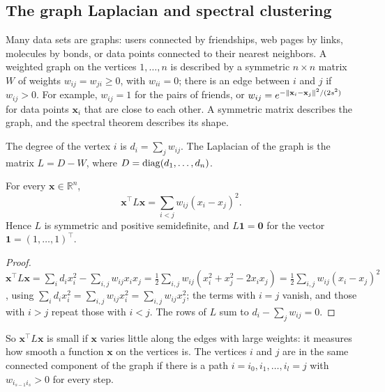 \subsection{The graph Laplacian and spectral clustering}\label{L2-sec:laplacian}

Many data sets are graphs: users connected by friendships, web pages by links, molecules by bonds, or data points connected to their nearest neighbors. A weighted graph on the vertices $1, \ldots, n$ is described by a symmetric $n \times n$ matrix $W$ of weights $w_{ij} = w_{ji} \geq 0$, with $w_{ii} = 0$; there is an edge between $i$ and $j$ if $w_{ij} > 0$. For example, $w_{ij} = 1$ for the pairs of friends, or $w_{ij} = e^{-\lVert \mathbf{x}_i - \mathbf{x}_j \rVert^2/(2s^2)}$ for data points $\mathbf{x}_i$ that are close to each other. A symmetric matrix describes the graph, and the spectral theorem describes its shape.

\begin{definition}\label{L2-def:laplacian}
    The degree of the vertex $i$ is $d_i = \sum_j w_{ij}$. The Laplacian of the graph is the matrix $L = D - W$, where $D = \operatorname{diag}(d_1, \ldots, d_n)$.
\end{definition}

\begin{proposition}\label{L2-prop:laplacian}
    For every $\mathbf{x} \in \mathbb{R}^n$,
    \[\mathbf{x}^\top L\mathbf{x} = \sum_{i < j} w_{ij}(x_i - x_j)^2.\]
    Hence $L$ is symmetric and positive semidefinite, and $L\mathbf{1} = \mathbf{0}$ for the vector $\mathbf{1} = (1, \ldots, 1)^\top$.
\end{proposition}

\begin{proof}
    $\mathbf{x}^\top L\mathbf{x} = \sum_i d_ix_i^2 - \sum_{i, j} w_{ij}x_ix_j = \frac{1}{2}\sum_{i, j} w_{ij}(x_i^2 + x_j^2 - 2x_ix_j) = \frac{1}{2}\sum_{i, j} w_{ij}(x_i - x_j)^2$, using $\sum_i d_ix_i^2 = \sum_{i, j} w_{ij}x_i^2 = \sum_{i, j} w_{ij}x_j^2$; the terms with $i = j$ vanish, and those with $i > j$ repeat those with $i < j$. The rows of $L$ sum to $d_i - \sum_j w_{ij} = 0$.
\end{proof}

So $\mathbf{x}^\top L\mathbf{x}$ is small if $\mathbf{x}$ varies little along the edges with large weights: it measures how smooth a function $\mathbf{x}$ on the vertices is. The vertices $i$ and $j$ are in the same connected component of the graph if there is a path $i = i_0, i_1, \ldots, i_l = j$ with $w_{i_{s-1}i_s} > 0$ for every step.


